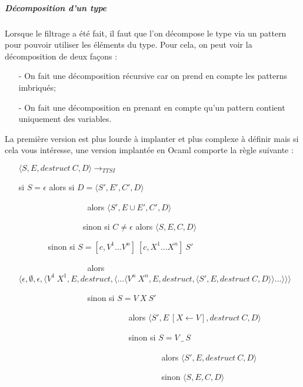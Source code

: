 \documentclass[10pt,a4paper]{report}
\begin{document}
	\subparagraph{Décomposition d'un type }  Lorsque le filtrage a été fait, il faut que l'on décompose le type via un pattern pour pouvoir utiliser les éléments du type. Pour cela, on peut voir la décomposition de deux façons :
	\begin{itemize}
		\item[-] On fait une décomposition récursive car on prend en compte les patterns imbriqués;
		\item[-] On fait une décomposition en prenant en compte qu'un pattern contient uniquement des variables.
	\end{itemize}
	\medbreak
	
	La première version est plus lourde à implanter et plus complexe à définir mais si cela vous intéresse, une version implantée en Ocaml comporte la règle suivante : 
	\smallbreak
	
	\begin{itemize}
		\item[] $\langle S,E,destruct~C,D\rangle \longrightarrow_{TTSI}$
		\item[] si $S = \epsilon$ alors si $D = \langle S',E',C',D\rangle$ 
		\item[] $\quad\quad\quad\quad\quad\quad\quad\quad$ alors $\langle S',E \cup E',C',D\rangle$ 
		\item[] $\quad\quad\quad\quad\quad\quad\quad~~$ sinon si $C \neq \epsilon$ alors $\langle S,E,C,D\rangle$
		\item[] $\quad\quad\quad~$ sinon si $S = [c,V^{1}...V^{n}]~[c,X^{1}...X^{n}]~S'$ 
		\item[] $\quad\quad\quad\quad\quad\quad\quad\quad$ alors $\langle \epsilon,\emptyset,\epsilon,\langle V^{1}~X^{1},E,destruct,\langle...\langle V^{n}~X^{n},E,destruct,\langle S',E,destruct~C,D\rangle\rangle...\rangle\rangle\rangle$
		\item[] $\quad\quad\quad\quad\quad\quad\quad\quad$ sinon si $S = V~X~S'$ 
		\item[] $\quad\quad\quad\quad\quad\quad\quad\quad\quad\quad\quad\quad\quad$ alors $\langle S',E~[X \leftarrow V],destruct~C,D\rangle$ 
		\item[] $\quad\quad\quad\quad\quad\quad\quad\quad\quad\quad\quad\quad\quad$ sinon si $S = V~\_~S$ 
		\item[] $\quad\quad\quad\quad\quad\quad\quad\quad\quad\quad\quad\quad\quad\quad\quad\quad\quad$ alors $\langle S',E,destruct~C,D\rangle$ 
		\item[] $\quad\quad\quad\quad\quad\quad\quad\quad\quad\quad\quad\quad\quad\quad\quad\quad\quad$ sinon $\langle S,E,C,D\rangle$ 
	\end{itemize}
	\medbreak
	
\end{document}
